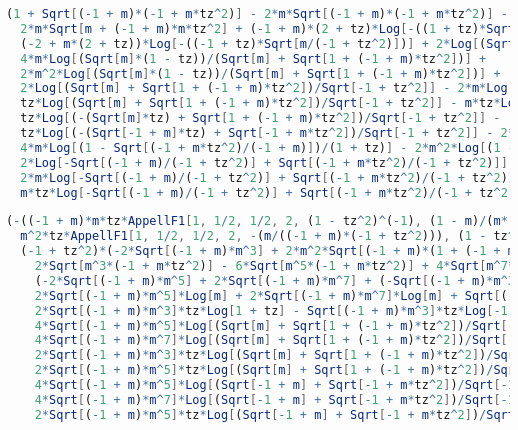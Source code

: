 \begin{lstlisting}[breaklines=true, caption={Expression for Type-II interband transition with \( t_z < -1 \), given in Mathematica format.\label{lst:typeii-interband-tzneg}},language=Mathematica]
(1 + Sqrt[(-1 + m)*(-1 + m*tz^2)] - 2*m*Sqrt[(-1 + m)*(-1 + m*tz^2)] - Sqrt[m + (-1 + m)*m*tz^2] +
  2*m*Sqrt[m + (-1 + m)*m*tz^2] + (-1 + m)*(2 + tz)*Log[-((1 + tz)*Sqrt[(-1 + m)/(-1 + tz^2)])] +
  (-2 + m*(2 + tz))*Log[-((-1 + tz)*Sqrt[m/(-1 + tz^2)])] + 2*Log[(Sqrt[m]*(1 - tz))/(Sqrt[m] + Sqrt[1 + (-1 + m)*tz^2])] -
  4*m*Log[(Sqrt[m]*(1 - tz))/(Sqrt[m] + Sqrt[1 + (-1 + m)*tz^2])] +
  2*m^2*Log[(Sqrt[m]*(1 - tz))/(Sqrt[m] + Sqrt[1 + (-1 + m)*tz^2])] +
  2*Log[(Sqrt[m] + Sqrt[1 + (-1 + m)*tz^2])/Sqrt[-1 + tz^2]] - 2*m*Log[(Sqrt[m] + Sqrt[1 + (-1 + m)*tz^2])/Sqrt[-1 + tz^2]] +
  tz*Log[(Sqrt[m] + Sqrt[1 + (-1 + m)*tz^2])/Sqrt[-1 + tz^2]] - m*tz*Log[(Sqrt[m] + Sqrt[1 + (-1 + m)*tz^2])/Sqrt[-1 + tz^2]] +
  tz*Log[(-(Sqrt[m]*tz) + Sqrt[1 + (-1 + m)*tz^2])/Sqrt[-1 + tz^2]] -
  tz*Log[(-(Sqrt[-1 + m]*tz) + Sqrt[-1 + m*tz^2])/Sqrt[-1 + tz^2]] - 2*Log[(1 - Sqrt[(-1 + m*tz^2)/(-1 + m)])/(1 + tz)] +
  4*m*Log[(1 - Sqrt[(-1 + m*tz^2)/(-1 + m)])/(1 + tz)] - 2*m^2*Log[(1 - Sqrt[(-1 + m*tz^2)/(-1 + m)])/(1 + tz)] +
  2*Log[-Sqrt[(-1 + m)/(-1 + tz^2)] + Sqrt[(-1 + m*tz^2)/(-1 + tz^2)]] -
  2*m*Log[-Sqrt[(-1 + m)/(-1 + tz^2)] + Sqrt[(-1 + m*tz^2)/(-1 + tz^2)]] -
  m*tz*Log[-Sqrt[(-1 + m)/(-1 + tz^2)] + Sqrt[(-1 + m*tz^2)/(-1 + tz^2)]])/4
\end{lstlisting}

\begin{lstlisting}[breaklines=true, caption={Expression for Type-II intraband transition with \( t_z > 1 \), given in Mathematica format.\label{lst:typeii-intraband-tzpos}},language=Mathematica]
(-((-1 + m)*m*tz*AppellF1[1, 1/2, 1/2, 2, (1 - tz^2)^(-1), (1 - m)/(m*(-1 + tz^2))]) +
  m^2*tz*AppellF1[1, 1/2, 1/2, 2, -(m/((-1 + m)*(-1 + tz^2))), (1 - tz^2)^(-1)] +
  (-1 + tz^2)*(-2*Sqrt[(-1 + m)*m^3] + 2*m^2*Sqrt[(-1 + m)*(1 + (-1 + m)*tz^2)] - 4*m^3*Sqrt[(-1 + m)*(1 + (-1 + m)*tz^2)] +
    2*Sqrt[m^3*(-1 + m*tz^2)] - 6*Sqrt[m^5*(-1 + m*tz^2)] + 4*Sqrt[m^7*(-1 + m*tz^2)] -
    (-2*Sqrt[(-1 + m)*m^5] + 2*Sqrt[(-1 + m)*m^7] + (-Sqrt[(-1 + m)*m^3] + Sqrt[(-1 + m)*m^5])*tz)*Log[-1 + m] -
    2*Sqrt[(-1 + m)*m^5]*Log[m] + 2*Sqrt[(-1 + m)*m^7]*Log[m] + Sqrt[(-1 + m)*m^5]*tz*Log[m] +
    2*Sqrt[(-1 + m)*m^3]*tz*Log[1 + tz] - Sqrt[(-1 + m)*m^3]*tz*Log[-1 + tz^2] -
    4*Sqrt[(-1 + m)*m^5]*Log[(Sqrt[m] + Sqrt[1 + (-1 + m)*tz^2])/Sqrt[-1 + tz^2]] +
    4*Sqrt[(-1 + m)*m^7]*Log[(Sqrt[m] + Sqrt[1 + (-1 + m)*tz^2])/Sqrt[-1 + tz^2]] -
    2*Sqrt[(-1 + m)*m^3]*tz*Log[(Sqrt[m] + Sqrt[1 + (-1 + m)*tz^2])/Sqrt[-1 + tz^2]] +
    2*Sqrt[(-1 + m)*m^5]*tz*Log[(Sqrt[m] + Sqrt[1 + (-1 + m)*tz^2])/Sqrt[-1 + tz^2]] +
    4*Sqrt[(-1 + m)*m^5]*Log[(Sqrt[-1 + m] + Sqrt[-1 + m*tz^2])/Sqrt[-1 + tz^2]] -
    4*Sqrt[(-1 + m)*m^7]*Log[(Sqrt[-1 + m] + Sqrt[-1 + m*tz^2])/Sqrt[-1 + tz^2]] -
    2*Sqrt[(-1 + m)*m^5]*tz*Log[(Sqrt[-1 + m] + Sqrt[-1 + m*tz^2])/Sqrt[-1 + tz^2]]))/(8*Sqrt[-1 + m]*m^(3/2)*(-1 + tz^2))
\end{lstlisting}

